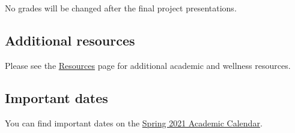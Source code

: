 \documentclass[
]{article}
\begin{document}
No grades will be changed after the final project presentations.

\hypertarget{additional-resources}{%
\subsection{Additional resources}\label{additional-resources}}

Please see the \href{../resources/}{Resources} page for additional
academic and wellness resources.

\hypertarget{important-dates}{%
\subsection{Important dates}\label{important-dates}}

You can find important dates on the
\href{https://registrar.duke.edu/spring-2021-academic-calendar}{Spring
2021 Academic Calendar}.
\end{document}
